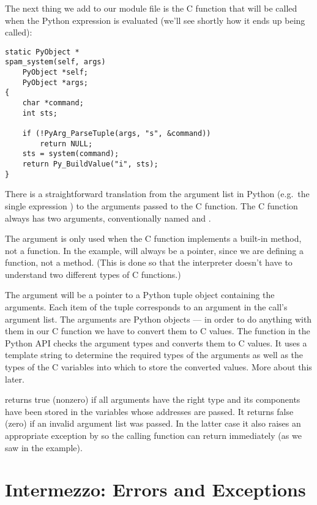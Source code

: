 \documentclass{manual}
\begin{document}
The next thing we add to our module file is the C function that will
be called when the Python expression 
is evaluated (we'll see shortly how it ends up being called):

\begin{verbatim}
static PyObject *
spam_system(self, args)
    PyObject *self;
    PyObject *args;
{
    char *command;
    int sts;

    if (!PyArg_ParseTuple(args, "s", &command))
        return NULL;
    sts = system(command);
    return Py_BuildValue("i", sts);
}
\end{verbatim}

There is a straightforward translation from the argument list in
Python (e.g.\ the single expression ) to the arguments
passed to the C function.  The C function always has two arguments,
conventionally named  and .

The  argument is only used when the C function implements a
built-in method, not a function. In the example,  will
always be a \NULL{} pointer, since we are defining a function, not a
method.  (This is done so that the interpreter doesn't have to
understand two different types of C functions.)

The  argument will be a pointer to a Python tuple object
containing the arguments.  Each item of the tuple corresponds to an
argument in the call's argument list.  The arguments are Python
objects --- in order to do anything with them in our C function we have
to convert them to C values.  The function 
in the Python API checks the argument types and converts them to C
values.  It uses a template string to determine the required types of
the arguments as well as the types of the C variables into which to
store the converted values.  More about this later.

 returns true (nonzero) if all arguments have
the right type and its components have been stored in the variables
whose addresses are passed.  It returns false (zero) if an invalid
argument list was passed.  In the latter case it also raises an
appropriate exception by so the calling function can return
\NULL{} immediately (as we saw in the example).


\section{Intermezzo: Errors and Exceptions
         \label{errors}}
\end{document}
